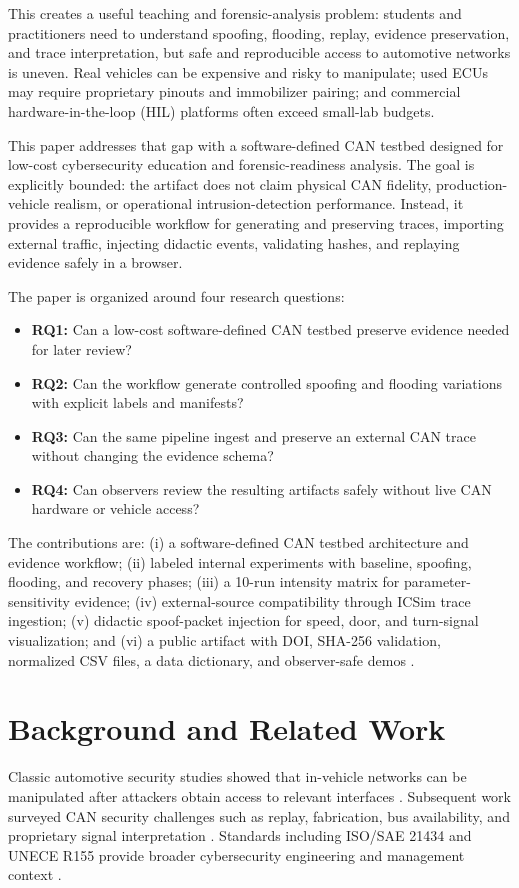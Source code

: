 \documentclass[conference]{IEEEtran}
\begin{document}
This creates a useful teaching and forensic-analysis problem: students and practitioners need to understand spoofing, flooding, replay, evidence preservation, and trace interpretation, but safe and reproducible access to automotive networks is uneven. Real vehicles can be expensive and risky to manipulate; used ECUs may require proprietary pinouts and immobilizer pairing; and commercial hardware-in-the-loop (HIL) platforms often exceed small-lab budgets.

This paper addresses that gap with a software-defined CAN testbed designed for low-cost cybersecurity education and forensic-readiness analysis. The goal is explicitly bounded: the artifact does not claim physical CAN fidelity, production-vehicle realism, or operational intrusion-detection performance. Instead, it provides a reproducible workflow for generating and preserving traces, importing external traffic, injecting didactic events, validating hashes, and replaying evidence safely in a browser.

The paper is organized around four research questions:
\begin{itemize}
  \item \textbf{RQ1:} Can a low-cost software-defined CAN testbed preserve evidence needed for later review?
  \item \textbf{RQ2:} Can the workflow generate controlled spoofing and flooding variations with explicit labels and manifests?
  \item \textbf{RQ3:} Can the same pipeline ingest and preserve an external CAN trace without changing the evidence schema?
  \item \textbf{RQ4:} Can observers review the resulting artifacts safely without live CAN hardware or vehicle access?
\end{itemize}

The contributions are: (i) a software-defined CAN testbed architecture and evidence workflow; (ii) labeled internal experiments with baseline, spoofing, flooding, and recovery phases; (iii) a 10-run intensity matrix for parameter-sensitivity evidence; (iv) external-source compatibility through ICSim trace ingestion; (v) didactic spoof-packet injection for speed, door, and turn-signal visualization; and (vi) a public artifact with DOI, SHA-256 validation, normalized CSV files, a data dictionary, and observer-safe demos \cite{janeri2026artifact}.

\section{Background and Related Work}
Classic automotive security studies showed that in-vehicle networks can be manipulated after attackers obtain access to relevant interfaces \cite{koscher2010experimental,checkoway2011comprehensive,miller2015remote}. Subsequent work surveyed CAN security challenges such as replay, fabrication, bus availability, and proprietary signal interpretation \cite{bozdal2020evaluation,lokman2019survey}. Standards including ISO/SAE 21434 and UNECE R155 provide broader cybersecurity engineering and management context \cite{iso21434,uneceR155}.
\end{document}
